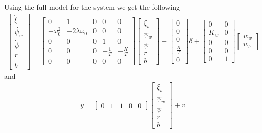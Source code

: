 Using the full model for the system we get the following
\begin{align}
\label{eq:54aModel}
    \begin{bmatrix}
        \Dot{\xi}\\
        \Dot{\psi_w}\\
        \Dot{\psi}\\
        \Dot{r}\\
        \Dot{b}
    \end{bmatrix}
    =
    \begin{bmatrix}
        0 & 1 & 0 & 0 & 0\\
        -\omega_0^2 & -2\lambda\omega_0 & 0 & 0 & 0\\
        0 & 0 & 0 & 1 & 0\\
        0 & 0 & 0 & -\frac{1}{T} & -\frac{K}{T}\\
        0 & 0 & 0 & 0 & 0
    \end{bmatrix}
    \begin{bmatrix}
        \xi_w\\
        \psi_w\\
        \psi\\
        r\\
        b
    \end{bmatrix}
    +
    \begin{bmatrix}
        0\\
        0\\
        0\\
        \frac{K}{T}\\
        0
    \end{bmatrix}
    \delta
    +
    \begin{bmatrix}
        0 & 0\\
        K_w & 0\\
        0 & 0\\
        0 & 0\\
        0 & 1
    \end{bmatrix}
    \begin{bmatrix}
        w_w\\
        w_b
    \end{bmatrix}
\end{align}
and 
\begin{align}
    y = 
    \begin{bmatrix}
        0 & 1 & 1 & 0 & 0
    \end{bmatrix}
    \begin{bmatrix}
        \xi_w\\
        \psi_w\\
        \psi\\
        r\\
        b
    \end{bmatrix}
    + v
\end{align}
